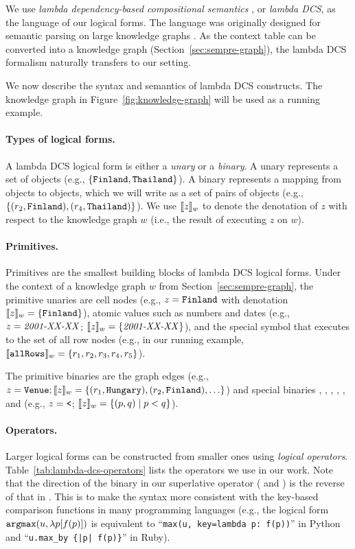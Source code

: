 We use \emph{lambda dependency-based
compositional semantics} \cite{liang2013lambdadcs},
or \emph{lambda DCS},
as the language of our logical forms.
The language was originally designed for semantic parsing
on large knowledge graphs
\cite{berant2013freebase}.
As the context table can be converted into a knowledge graph
(Section~\ref{sec:sempre-graph}),
the lambda DCS formalism naturally transfers to our setting.

We now describe the syntax and semantics of lambda DCS constructs.
The knowledge graph in Figure~\ref{fig:knowledge-graph}
will be used as a running example.

\paragraph{Types of logical forms.}
A lambda DCS logical form is either a \emph{unary} or a \emph{binary}.
A unary represents a set of objects
(e.g., $\left\{ \texttt{Finland}, \texttt{Thailand} \right\}$).
A binary represents a mapping from objects to objects,
which we will write as a set of pairs of objects
(e.g., $\left\{ (r_2, \texttt{Finland}), (r_4, \texttt{Thailand}) \right\}$).
We use $\llbracket{z}\rrbracket_{w}$ to denote the denotation of $z$
with respect to the knowledge graph $w$
(i.e., the result of executing $z$ on $w$).

\paragraph{Primitives.}
Primitives are the smallest building blocks of lambda DCS logical forms.
Under the context of a knowledge graph $w$ from Section~\ref{sec:sempre-graph},
the primitive unaries are cell nodes
(e.g., $z = \texttt{Finland}$ with denotation $\llbracket{z}\rrbracket_{w} = \left\{ \texttt{Finland} \right\}$),
atomic values such as numbers and dates
(e.g., $z = \text{\emph{2001-XX-XX}}$; $\llbracket{z}\rrbracket_{w} = \left\{ \text{\emph{2001-XX-XX}} \right\}$),
and the special  symbol that executes
to the set of all row nodes (e.g.,
in our running example, $\llbracket{\texttt{allRows}}\rrbracket_{w} = \{r_1, r_2, r_3, r_4, r_5\}$).

The primitive binaries are the graph edges
(e.g., $z = \T{Venue}; \deno{z}{w} = \set{(r_1, \T{Hungary}), (r_2, \T{Finland}), \dots}$)
and special binaries \T{=}, \T{!=}, \T{<}, \T{<=}, \T{>}, and \T{>=}
(e.g., $z = \texttt{<}$; $\llbracket{z}\rrbracket_{w} = \left\{ (p, q) \mid p < q \right\}$).

\paragraph{Operators.}
Larger logical forms can be constructed from smaller ones
using \emph{logical operators}.
Table~\ref{tab:lambda-dcs-operators}
lists the operators we use in our work.
Note that the direction of the binary
in our superlative operator ( and )
is the reverse of that in \citet{liang2013lambdadcs}.
This is to make the syntax more consistent
with the key-based comparison functions in many programming languages
(e.g., the logical form
$\texttt{argmax}(u, \lambda p[f(p)])$ is equivalent to
``\verb|max(u, key=lambda p: f(p))|'' in Python and
``\verb+u.max_by {|p| f(p)}+'' in Ruby).

